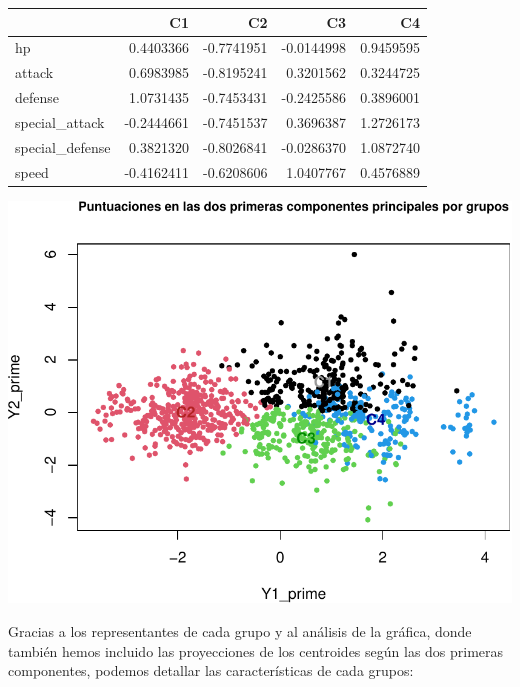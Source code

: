 \documentclass[
  11.8pt,
]{extreport}
\begin{document}
\begin{table}[H]
\centering\begingroup\fontsize{11.5}{13.5}\selectfont

\begin{tabular}{lrrrr}
\toprule
  & C1 & C2 & C3 & C4\\
\midrule
hp & 0.4403366 & -0.7741951 & -0.0144998 & 0.9459595\\
attack & 0.6983985 & -0.8195241 & 0.3201562 & 0.3244725\\
defense & 1.0731435 & -0.7453431 & -0.2425586 & 0.3896001\\
special\_attack & -0.2444661 & -0.7451537 & 0.3696387 & 1.2726173\\
special\_defense & 0.3821320 & -0.8026841 & -0.0286370 & 1.0872740\\
\addlinespace
speed & -0.4162411 & -0.6208606 & 1.0407767 & 0.4576889\\
\bottomrule
\end{tabular}
\endgroup{}
\end{table}

\begin{center}
\includegraphics{trabajo_files/figure-pdf/unnamed-chunk-43-1.pdf}
\end{center}

Gracias a los representantes de cada grupo y al análisis de la gráfica,
donde también hemos incluido las proyecciones de los centroides según
las dos primeras componentes, podemos detallar las características de
cada grupos:
\end{document}

